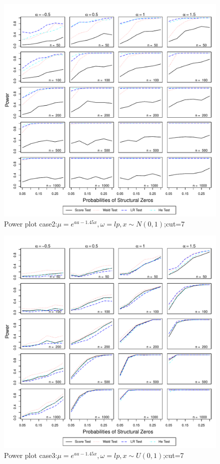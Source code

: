 \documentclass[11pt]{article}
\numberwithin{equation}{section}
\begin{document}
\begin{figure}
  \centering
  \includegraphics[width=\columnwidth]{./figure/p/p72.pdf}
  \caption{Power plot case2:$\mu=e^{aa-1.45x},\omega=lp,x\sim N(0,1)$;cut=7}
\end{figure}

\begin{figure}
  \centering
  \includegraphics[width=\columnwidth]{./figure/p/p73.pdf}
  \caption{Power plot case3:$\mu=e^{aa-1.45x},\omega=lp,x\sim U(0,1)$;cut=7}
\end{figure}
\end{document}
